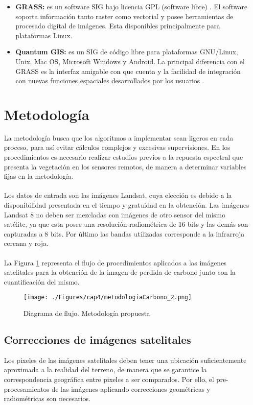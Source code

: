 \begin{itemize}
	\item \textbf{GRASS: }es un software SIG  bajo licencia GPL (software libre) \cite{osgeoGrass}. El software soporta informaci\'on tanto raster como vectorial y posee herramientas de procesado digital de im\'agenes. Esta disponibles principalmente para plataformas Linux.
	\item \textbf{Quantum GIS: }es un SIG de c\'odigo libre para plataformas GNU/Linux, Unix, Mac OS, Microsoft Windows y Android. La principal diferencia con el GRASS es la interfaz amigable con que cuenta y la facilidad de integraci\'on con nuevas funciones espaciales desarrollados por los usuarios \cite{qgisSIG}.
\end{itemize}

\section{Metodolog\'ia}
La metodolog\'ia busca que los algoritmos a implementar sean ligeros en cada proceso, para as\'i evitar c\'alculos complejos y excesivas supervisiones. En los procedimientos es necesario realizar estudios previos a la repuesta espectral que presenta la vegetaci\'on en los sensores remotos, de manera a determinar variables fijas en la metodolog\'ia.\\~\\
Los datos de entrada son las im\'agenes Landsat, cuya elecci\'on es debido a la disponibilidad presentada en el tiempo y gratuidad en la  obtenci\'on. Las im\'agenes Landsat 8 no deben ser mezcladas con im\'agenes de otro sensor del mismo sat\'elite, ya que esta posee una resoluci\'on radiom\'etrica de 16 bits y las dem\'as son capturadas a 8 bits. Por \'ultimo las bandas utilizadas corresponde a la infrarroja cercana y roja.\\~\\
La Figura \ref{fig:metodologiapc} representa el flujo de procedimientos aplicados a las im\'agenes satelitales para la obtenci\'on de la imagen de perdida de carbono junto con la cuantificaci\'on del mismo.

\begin{figure}[H]
	\centering
	\texttt{[image: ./Figures/cap4/metodologiaCarbono\_2.png]}
	\caption{Diagrama de flujo. Metodolog\'ia propuesta}
	\label{fig:metodologiapc}
\end{figure}

\subsection{Correcciones de im\'agenes satelitales}\label{sec:coorImsat}
Los pixeles de las im\'agenes satelitales deben tener una ubicaci\'on suficientemente aproximada a la realidad del terreno, de manera que se garantice la correspondencia geogr\'afica entre pixeles a ser comparados. Por ello, el pre-procesamientos de las im\'agenes aplicando correcciones geom\'etricas y radiom\'etricas son necesarios.

